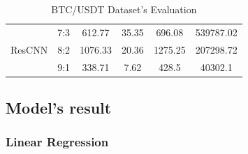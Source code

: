 \documentclass{ieeeojies}
\begin{document}
\begin{table}[H]
\begin{tabular}{|c|c|c|c|c|c|}
         \hline
         \multirow{3}{*}{ResCNN} & 7:3 & 612.77 & 35.35 & 696.08 & 539787.02 \\ & 8:2 & 1076.33 & 20.36 & 1275.25 & 207298.72 \\ & 9:1 & 338.71 & 7.62 & 428.5 & 40302.1 \\
         \hline
    \end{tabular}
    \caption{BTC/USDT Dataset's Evaluation}
    \label{btcresult}
\end{table}

\subsection{Model's result}
\subsubsection{Linear Regression}
\end{document}
